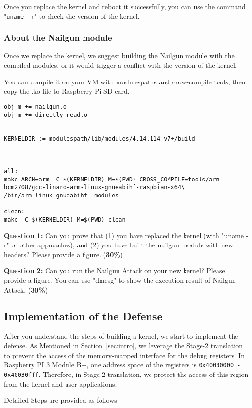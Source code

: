 Once you replace the kernel and reboot it successfully, you can use the command "\texttt{uname -r}" to check the version of the kernel.

\subsubsection{About the Nailgun module}
Once we replace the kernel, we suggest building the Nailgun module with the compiled modules, or it would trigger a conflict with the version of the kernel.

You can compile it on your VM with modulespaths and cross-compile tools, then copy the .ko file to Raspberry Pi SD card.

\begin{lstlisting}
obj-m += nailgun.o
obj-m += directly_read.o


KERNELDIR := modulespath/lib/modules/4.14.114-v7+/build



all:
make ARCH=arm -C $(KERNELDIR) M=$(PWD) CROSS_COMPILE=tools/arm-bcm2708/gcc-linaro-arm-linux-gnueabihf-raspbian-x64\
/bin/arm-linux-gnueabihf- modules

clean:
make -C $(KERNELDIR) M=$(PWD) clean
\end{lstlisting}

\textbf{Question 1:} Can you prove that (1) you have replaced the kernel (with "uname -r" or other approaches), and (2) you have built the nailgun module with new headers? Please provide a figure. (\textbf{30\%})

\textbf{Question 2:} Can you run the Nailgun Attack on your new kernel? Please provide a figure. You can use "dmesg" to show the execution result of Nailgun Attack. (\textbf{30\%})

\subsection{Implementation of the Defense}

After you understand the steps of building a kernel, we start to implement the defense. As Mentioned in Section~\ref{sec:intro}, we leverage the Stage-2 translation to prevent the access of the memory-mapped interface for the debug registers. In Raspberry PI 3 Module B+, one address space of the registers is \texttt{0x40030000 - 0x40030fff}.
Therefore, in Stage-2 translation, we protect the access of this region from the kernel and user applications.

Detailed Steps are provided as follows:

